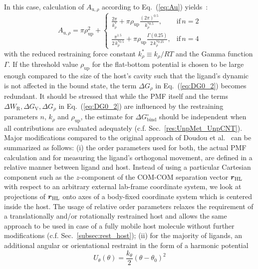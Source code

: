 \documentclass[9pt,lessons]{livecoms}
\begin{document}
%
In this case, calculation of $A_{\mathrm{u},\rho}$ according to Eq.~(\ref{eq:Au}) yields~\cite{markthaler2017molecular}:
\begin{equation}
A_{\mathrm{u},\rho}  
		= \pi \rho_\mathrm{up}^2 +
		\left\{\begin{array}{ll} 
		\frac{2 \pi}{k_\rho^{*}} + \pi \rho_\mathrm{up} \frac{(2 \pi)^{0.5}}{k_\rho^{* 0.5}}, & \mathrm{if} \, n = 2 \\
		\frac{\pi^{1.5}}{2\, k_\rho^{* 0.5}} + \pi \rho_\mathrm{up} \frac{\Gamma(0.25)}{2\, k_\rho^{* 0.25}}, & \mathrm{if} \, n = 4
		\end{array}\right. 
\label{eq:Au_2}
\end{equation}
with the reduced restraining force constant $k_\rho^{*} \equiv k_\rho/RT$ and the Gamma function $\Gamma$.
%
If the threshold value $\rho_\mathrm{up}$ for the flat-bottom potential is chosen to be large enough compared to the size of the host's cavity 
such that the ligand's dynamic is not affected in the bound state, the term $\Delta G_\rho$ in Eq.~(\ref{eq:DG0_2}) becomes redundant.
It should be stressed that while the PMF itself and the terms $\Delta W_\mathrm{R}, \Delta G_\mathrm{V}, \Delta G_\rho$ in Eq.~(\ref{eq:DG0_2}) are influenced by the restraining parameters 
$n$, $k_\rho$ and $\rho_\mathrm{up}$, the estimate for $\Delta G^\circ_\mathrm{bind}$ should be independent when all contributions are evaluated adequately (c.f. Sec.~\ref{res:UnpMet_UnpCNT}).
%
Major modifications compared to the original approach of Doudou et al.~\cite{doudou2009standard} can be summarized as follows:
(i) the order parameters used for both, the actual PMF calculation and for measuring the ligand's orthogonal movement, are defined in a relative manner between ligand and host. 
Instead of using a particular Cartesian component such as the $z$-component of the COM-COM separation vector $\text{\boldmath $r$}_\mathrm{HL}$ with respect to an arbitrary external lab-frame coordinate system, 
we look at projections of $\text{\boldmath $r$}_\mathrm{HL}$ onto axes of a body-fixed coordinate system which is centered inside the host.
The usage of relative order parameters relaxes the requirement of a translationally and/or rotationally restrained host and allows the same approach to be used in case of a fully mobile host molecule without further modifications (c.f. Sec.~\ref{subsec:rest_host});
(ii) for the majority of ligands, an additional angular or orientational restraint in the form of a harmonic potential 
\begin{equation}
U_\theta(\theta) = \frac{k_\theta}{2}(\theta-\theta_0)^2
\label{eq:ori_restr}
\end{equation}
\end{document}
